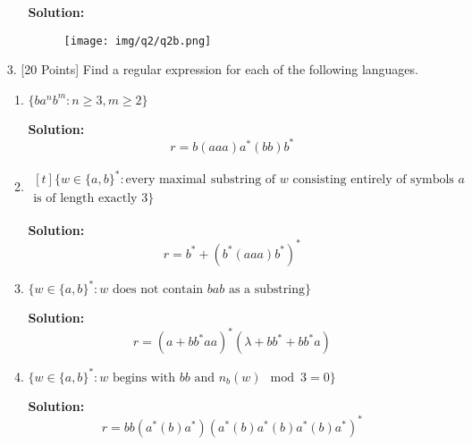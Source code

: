 \documentclass[12pt]{article}
\begin{document}
\begin{spacing}{1.5}
\begin{enumerate}
\begin{enumerate}
                              \textbf{Solution:}

                              \begin{figure}[h!]
                                    \centering
                                    \texttt{[image: img/q2/q2b.png]}
                              \end{figure}
                  \end{enumerate}

                  \newpage
            \item[3.] [20 Points] Find a regular expression for each of the following languages.

                  \begin{enumerate}
                        \item $\{ba^nb^m : n \geq 3, m \geq 2 \}$

                              \textbf{Solution:} $$r = b(aaa)a^*(bb)b^*$$

                        \item
                              $
                                    \begin{aligned}[t]
                                          \{ w \in \{a,b \}^* : \text{every maximal } & \text{substring of } w \text{ consisting entirely of symbols $a$} \\ \text{is of length exactly 3} \}
                                    \end{aligned}
                              $

                              \textbf{Solution:} $$r = b^* + (b^*(aaa)b^*)^*$$

                        \item $\{w \in \{a,b \}^* : w \text{ does not contain $bab$ as a substring} \}$

                              \textbf{Solution:} $$r = (a+bb^*aa)^*(\lambda+bb^*+bb^*a)$$

                        \item $\{w \in \{a,b\}^* : w \text{ begins with $bb$ and } n_b(w) \mod 3 = 0 \}$

                              \textbf{Solution:} $$r = bb(a^*(b)a^*)(a^*(b)a^*(b)a^*(b)a^*)^*$$
                  \end{enumerate}

      \end{enumerate}

\end{spacing}
\end{document}
